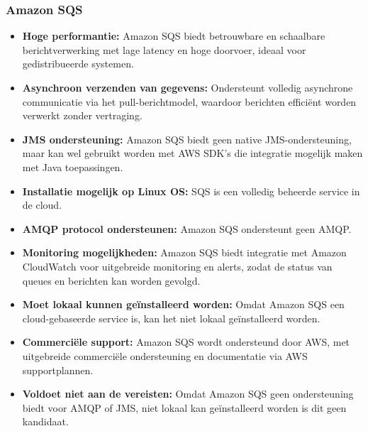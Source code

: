 \subsubsection{Amazon SQS}
\begin{itemize}
    \item \textbf{Hoge performantie:} Amazon SQS biedt betrouwbare en schaalbare berichtverwerking met lage latency en hoge doorvoer, ideaal voor gedistribueerde systemen.
    \item \textbf{Asynchroon verzenden van gegevens:} Ondersteunt volledig asynchrone communicatie via het pull-berichtmodel, waardoor berichten efficiënt worden verwerkt zonder vertraging.
    \item \textbf{JMS ondersteuning:} Amazon SQS biedt geen native JMS-ondersteuning, maar kan wel gebruikt worden met AWS SDK's die integratie mogelijk maken met Java toepassingen.
    \item \textbf{Installatie mogelijk op Linux OS:} SQS is een volledig beheerde service in de cloud.
    \item \textbf{AMQP protocol ondersteunen:} Amazon SQS ondersteunt geen AMQP.
    \item \textbf{Monitoring mogelijkheden:} Amazon SQS biedt integratie met Amazon CloudWatch voor uitgebreide monitoring en alerts, zodat de status van queues en berichten kan worden gevolgd.
    \item \textbf{Moet lokaal kunnen geïnstalleerd worden:} Omdat Amazon SQS een cloud-gebaseerde service is, kan het niet lokaal geïnstalleerd worden.
    \item \textbf{Commerciële support:} Amazon SQS wordt ondersteund door AWS, met uitgebreide commerciële ondersteuning en documentatie via AWS supportplannen.
    \item \textbf{Voldoet niet aan de vereisten:}
    Omdat Amazon SQS geen ondersteuning biedt voor AMQP of JMS, niet lokaal kan geïnstalleerd worden is dit geen kandidaat.
\end{itemize}

